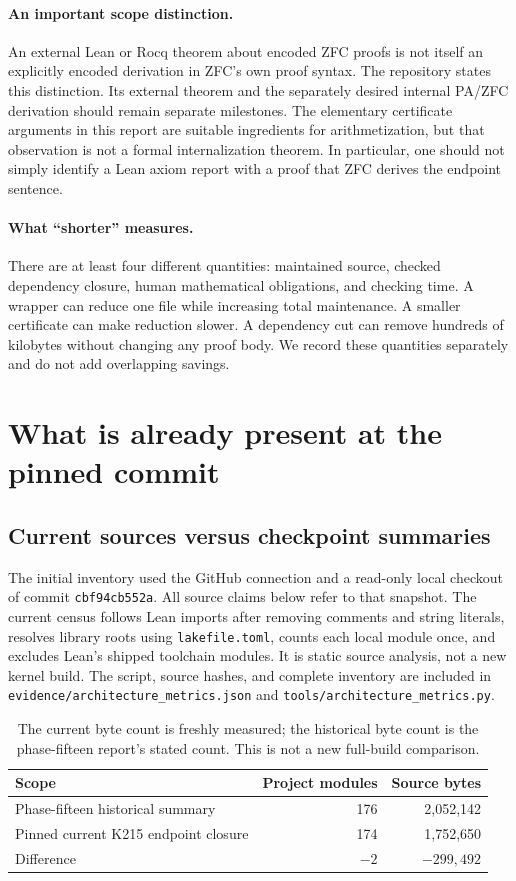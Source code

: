 \documentclass[11pt]{article}
\theoremstyle{remark}\newtheorem{remark}[theorem]{Remark}
\newcommand{\code}[1]{\texttt{\small #1}}
\begin{document}
\paragraph{An important scope distinction.}
An external Lean or Rocq theorem about encoded ZFC proofs is not itself an explicitly encoded derivation in ZFC's own proof syntax. The repository states this distinction. Its external theorem and the separately desired internal PA/ZFC derivation should remain separate milestones. The elementary certificate arguments in this report are suitable ingredients for arithmetization, but that observation is not a formal internalization theorem. In particular, one should not simply identify a Lean axiom report with a proof that ZFC derives the endpoint sentence.

\paragraph{What ``shorter'' measures.}
There are at least four different quantities: maintained source, checked dependency closure, human mathematical obligations, and checking time. A wrapper can reduce one file while increasing total maintenance. A smaller certificate can make reduction slower. A dependency cut can remove hundreds of kilobytes without changing any proof body. We record these quantities separately and do not add overlapping savings.

\section{What is already present at the pinned commit}

\subsection{Current sources versus checkpoint summaries}
The initial inventory used the GitHub connection and a read-only local checkout of commit \texttt{cbf94cb552a}. All source claims below refer to that snapshot. The current census follows Lean imports after removing comments and string literals, resolves library roots using \code{lakefile.toml}, counts each local module once, and excludes Lean's shipped toolchain modules. It is static source analysis, not a new kernel build. The script, source hashes, and complete inventory are included in \code{evidence/architecture\_metrics.json} and \code{tools/architecture\_metrics.py}.

\begin{table}[ht]
\centering
\begin{tabular}{lrr}
\toprule
Scope & Project modules & Source bytes\\
\midrule
Phase-fifteen historical summary & 176 & 2,052,142\\
Pinned current K215 endpoint closure & 174 & 1,752,650\\
Difference & $-2$ & $-299,492$\\
\bottomrule
\end{tabular}
\caption{The current byte count is freshly measured; the historical byte count is the phase-fifteen report's stated count. This is not a new full-build comparison.}
\end{table}
\end{document}

